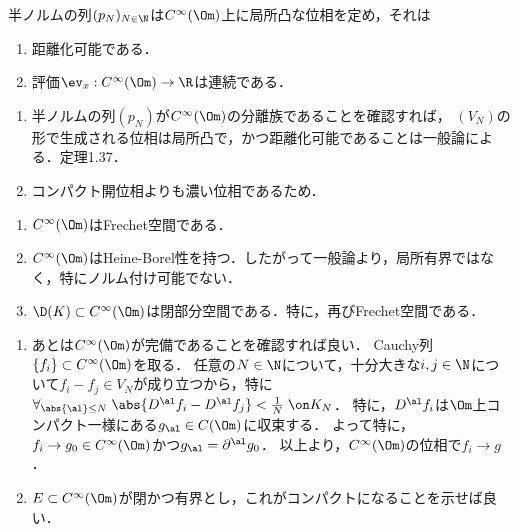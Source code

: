 \documentclass[uplatex,dvipdfmx]{jsreport}
\begin{document}
\begin{lemma}
    半ノルムの列$(p_N)_{N\in\N}$は$C^\infty(\Om)$上に局所凸な位相を定め，それは
    \begin{enumerate}
        \item 距離化可能である．
        \item 評価$\ev_x:C^\infty(\Om)\to\R$は連続である．
    \end{enumerate}
\end{lemma}
\begin{Proof}\mbox{}
    \begin{enumerate}
        \item 半ノルムの列$(p_N)$が$C^\infty(\Om)$の分離族であることを確認すれば，
        $(V_N)$の形で生成される位相は局所凸で，かつ距離化可能であることは一般論による．\cite{Rudin-FunctionalAnalysis}定理1.37．
        \item コンパクト開位相よりも濃い位相であるため．
    \end{enumerate}
\end{Proof}

\begin{proposition}\mbox{}
    \begin{enumerate}
        \item $C^\infty(\Om)$はFrechet空間である．
        \item $C^\infty(\Om)$はHeine-Borel性を持つ．したがって一般論より，局所有界ではなく，特にノルム付け可能でない．
        \item $\D(K)\subset C^\infty(\Om)$は閉部分空間である．特に，再びFrechet空間である．
    \end{enumerate}
\end{proposition}
\begin{Proof}\mbox{}
    \begin{enumerate}
        \item あとは$C^\infty(\Om)$が完備であることを確認すれば良い．
        Cauchy列$\{f_i\}\subset C^\infty(\Om)$を取る．
        任意の$N\in\N$について，十分大きな$i,j\in\N$について$f_i-f_j\in V_N$が成り立つから，特に$\forall_{\abs{\al}\le N}\;\abs{D^\al f_i-D^\al f_j}<\frac{1}{N}\;\on K_N$．
        特に，$D^\al f_i$は$\Om$上コンパクト一様にある$g_\al\in C(\Om)$に収束する．
        よって特に，$f_i\to g_0\in C^\infty(\Om)$かつ$g_\al=\partial^\al g_0$．
        以上より，$C^\infty(\Om)$の位相で$f_i\to g$．
        \item $E\subset C^\infty(\Om)$が閉かつ有界とし，これがコンパクトになることを示せば良い．
    \end{enumerate}
\end{Proof}
\end{document}
